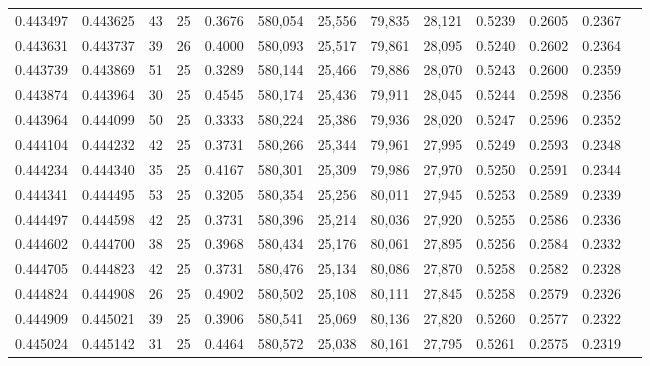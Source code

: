 \begin{tabular}{rrrrrrrrrrrrr}
0.443497 & 0.443625 &    43 &  25 &                                     0.3676 & 580,054 &  25,556 &  79,835 &  28,121 & 0.5239 & 0.2605 & 0.2367 \\
0.443631 & 0.443737 &    39 &  26 &                                     0.4000 & 580,093 &  25,517 &  79,861 &  28,095 & 0.5240 & 0.2602 & 0.2364 \\
0.443739 & 0.443869 &    51 &  25 &                                     0.3289 & 580,144 &  25,466 &  79,886 &  28,070 & 0.5243 & 0.2600 & 0.2359 \\
0.443874 & 0.443964 &    30 &  25 &                                     0.4545 & 580,174 &  25,436 &  79,911 &  28,045 & 0.5244 & 0.2598 & 0.2356 \\
0.443964 & 0.444099 &    50 &  25 &                                     0.3333 & 580,224 &  25,386 &  79,936 &  28,020 & 0.5247 & 0.2596 & 0.2352 \\
0.444104 & 0.444232 &    42 &  25 &                                     0.3731 & 580,266 &  25,344 &  79,961 &  27,995 & 0.5249 & 0.2593 & 0.2348 \\
0.444234 & 0.444340 &    35 &  25 &                                     0.4167 & 580,301 &  25,309 &  79,986 &  27,970 & 0.5250 & 0.2591 & 0.2344 \\
0.444341 & 0.444495 &    53 &  25 &                                     0.3205 & 580,354 &  25,256 &  80,011 &  27,945 & 0.5253 & 0.2589 & 0.2339 \\
0.444497 & 0.444598 &    42 &  25 &                                     0.3731 & 580,396 &  25,214 &  80,036 &  27,920 & 0.5255 & 0.2586 & 0.2336 \\
0.444602 & 0.444700 &    38 &  25 &                                     0.3968 & 580,434 &  25,176 &  80,061 &  27,895 & 0.5256 & 0.2584 & 0.2332 \\
0.444705 & 0.444823 &    42 &  25 &                                     0.3731 & 580,476 &  25,134 &  80,086 &  27,870 & 0.5258 & 0.2582 & 0.2328 \\
0.444824 & 0.444908 &    26 &  25 &                                     0.4902 & 580,502 &  25,108 &  80,111 &  27,845 & 0.5258 & 0.2579 & 0.2326 \\
0.444909 & 0.445021 &    39 &  25 &                                     0.3906 & 580,541 &  25,069 &  80,136 &  27,820 & 0.5260 & 0.2577 & 0.2322 \\
0.445024 & 0.445142 &    31 &  25 &                                     0.4464 & 580,572 &  25,038 &  80,161 &  27,795 & 0.5261 & 0.2575 & 0.2319 \\

\end{tabular}
